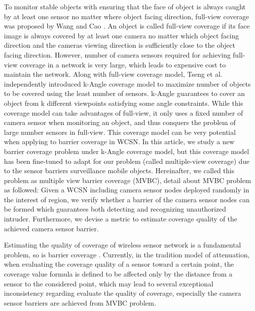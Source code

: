 \documentclass[3p]{elsarticle}
\begin{document}
To monitor stable objects with ensuring that the face of object is always caught by at least one sensor no matter where object facing direction, full-view coverage was proposed by Wang and Cao \cite{wang2013achieving}. An object is called full-view coverage if its face image is always covered by at least one camera no matter which object facing direction and the cameras viewing direction is sufficiently close to the object facing direction.  
However, number of camera sensors required for achieving full-view coverage in a network is very large, which leads to expensive cost to maintain the network. Along with full-view coverage model, Tseng et al. \cite{tseng2012k} independently introduced k-Angle coverage model to maximize number of objects to be covered using the least number of sensors. k-Angle guarantees to cover an object from k different viewpoints satisfying some angle constraints. While this coverage model can take advantages of full-view, it only uses a fixed number of camera sensor when monitoring an object, and thus conquers the problem of large number sensors in full-view. 
This coverage model can be very potential when applying to barrier coverage in WCSN. In this article, we study a new barrier coverage problem under k-Angle coverage model, but this coverage model has been fine-tuned to adapt for our problem (called multiple-view coverage) due to the sensor barriers surveillance mobile objects. Hereinafter, we called this problem as multiple view barrier coverage (MVBC), detail about MVBC problem as followed: Given a WCSN including camera sensor nodes deployed randomly in the interest of region, we verify whether a barrier of the camera sensor nodes can be formed  which guarantees both detecting and recognizing unauthorized intruder. Furthermore, we devise a metric to estimate coverage quality of the achieved camera sensor barrier. \par
%
Estimating the quality of coverage of wireless sensor network is a  fundamental problem, so is barrier coverage \cite{sangwan2015survey,ghosh2008coverage}. Currently, in the tradition model of attenuation, when evaluating the coverage quality of a sensor toward a certain point, the coverage value formula is defined to be affected only by the distance from a sensor to the considered point, which may lead to several exceptional inconsistency regarding evaluate the quality of coverage, especially the camera sensor barriers are achieved from MVBC problem. 
\end{document}
